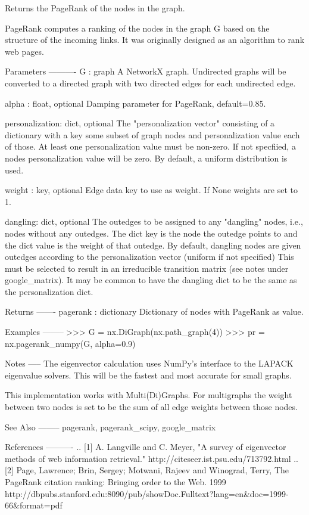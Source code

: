 \begin{DoxyVerb}Returns the PageRank of the nodes in the graph.

PageRank computes a ranking of the nodes in the graph G based on
the structure of the incoming links. It was originally designed as
an algorithm to rank web pages.

Parameters
----------
G : graph
  A NetworkX graph.  Undirected graphs will be converted to a directed
  graph with two directed edges for each undirected edge.

alpha : float, optional
  Damping parameter for PageRank, default=0.85.

personalization: dict, optional
  The "personalization vector" consisting of a dictionary with a
  key some subset of graph nodes and personalization value each of those.
  At least one personalization value must be non-zero.
  If not specfiied, a nodes personalization value will be zero.
  By default, a uniform distribution is used.

weight : key, optional
  Edge data key to use as weight.  If None weights are set to 1.

dangling: dict, optional
  The outedges to be assigned to any "dangling" nodes, i.e., nodes without
  any outedges. The dict key is the node the outedge points to and the dict
  value is the weight of that outedge. By default, dangling nodes are given
  outedges according to the personalization vector (uniform if not
  specified) This must be selected to result in an irreducible transition
  matrix (see notes under google_matrix). It may be common to have the
  dangling dict to be the same as the personalization dict.

Returns
-------
pagerank : dictionary
   Dictionary of nodes with PageRank as value.

Examples
--------
>>> G = nx.DiGraph(nx.path_graph(4))
>>> pr = nx.pagerank_numpy(G, alpha=0.9)

Notes
-----
The eigenvector calculation uses NumPy's interface to the LAPACK
eigenvalue solvers.  This will be the fastest and most accurate
for small graphs.

This implementation works with Multi(Di)Graphs. For multigraphs the
weight between two nodes is set to be the sum of all edge weights
between those nodes.

See Also
--------
pagerank, pagerank_scipy, google_matrix

References
----------
.. [1] A. Langville and C. Meyer,
   "A survey of eigenvector methods of web information retrieval."
   http://citeseer.ist.psu.edu/713792.html
.. [2] Page, Lawrence; Brin, Sergey; Motwani, Rajeev and Winograd, Terry,
   The PageRank citation ranking: Bringing order to the Web. 1999
   http://dbpubs.stanford.edu:8090/pub/showDoc.Fulltext?lang=en&doc=1999-66&format=pdf
\end{DoxyVerb}
